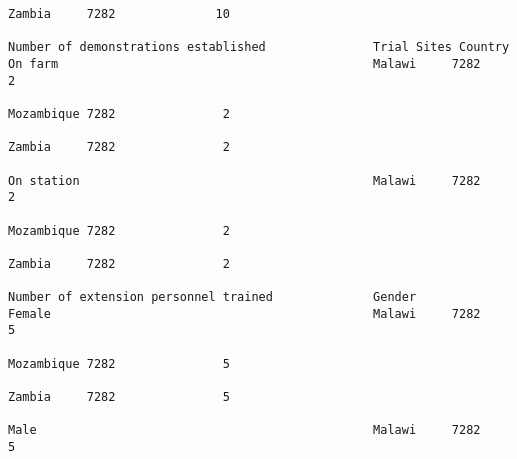 \documentclass[11pt]{article}
\begin{document}
\begin{Verbatim}[commandchars=\\\{\}]
                                                                                                                                                                                                                 Zambia     7282              10  
                                                                         Number of demonstrations established               Trial Sites Country               On farm                                            Malawi     7282               2  
                                                                                                                                                                                                                 Mozambique 7282               2  
                                                                                                                                                                                                                 Zambia     7282               2  
                                                                                                                                                              On station                                         Malawi     7282               2  
                                                                                                                                                                                                                 Mozambique 7282               2  
                                                                                                                                                                                                                 Zambia     7282               2  
                                                                         Number of extension personnel trained              Gender                            Female                                             Malawi     7282               5  
                                                                                                                                                                                                                 Mozambique 7282               5  
                                                                                                                                                                                                                 Zambia     7282               5  
                                                                                                                                                              Male                                               Malawi     7282               5  

\end{Verbatim}
\end{document}
